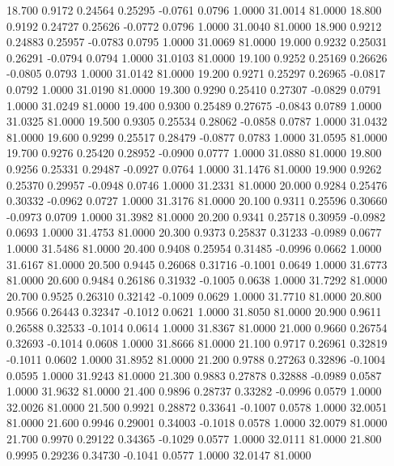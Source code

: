   18.700   0.9172   0.24564   0.25295  -0.0761   0.0796   1.0000  31.0014  81.0000
  18.800   0.9192   0.24727   0.25626  -0.0772   0.0796   1.0000  31.0040  81.0000
  18.900   0.9212   0.24883   0.25957  -0.0783   0.0795   1.0000  31.0069  81.0000
  19.000   0.9232   0.25031   0.26291  -0.0794   0.0794   1.0000  31.0103  81.0000
  19.100   0.9252   0.25169   0.26626  -0.0805   0.0793   1.0000  31.0142  81.0000
  19.200   0.9271   0.25297   0.26965  -0.0817   0.0792   1.0000  31.0190  81.0000
  19.300   0.9290   0.25410   0.27307  -0.0829   0.0791   1.0000  31.0249  81.0000
  19.400   0.9300   0.25489   0.27675  -0.0843   0.0789   1.0000  31.0325  81.0000
  19.500   0.9305   0.25534   0.28062  -0.0858   0.0787   1.0000  31.0432  81.0000
  19.600   0.9299   0.25517   0.28479  -0.0877   0.0783   1.0000  31.0595  81.0000
  19.700   0.9276   0.25420   0.28952  -0.0900   0.0777   1.0000  31.0880  81.0000
  19.800   0.9256   0.25331   0.29487  -0.0927   0.0764   1.0000  31.1476  81.0000
  19.900   0.9262   0.25370   0.29957  -0.0948   0.0746   1.0000  31.2331  81.0000
  20.000   0.9284   0.25476   0.30332  -0.0962   0.0727   1.0000  31.3176  81.0000
  20.100   0.9311   0.25596   0.30660  -0.0973   0.0709   1.0000  31.3982  81.0000
  20.200   0.9341   0.25718   0.30959  -0.0982   0.0693   1.0000  31.4753  81.0000
  20.300   0.9373   0.25837   0.31233  -0.0989   0.0677   1.0000  31.5486  81.0000
  20.400   0.9408   0.25954   0.31485  -0.0996   0.0662   1.0000  31.6167  81.0000
  20.500   0.9445   0.26068   0.31716  -0.1001   0.0649   1.0000  31.6773  81.0000
  20.600   0.9484   0.26186   0.31932  -0.1005   0.0638   1.0000  31.7292  81.0000
  20.700   0.9525   0.26310   0.32142  -0.1009   0.0629   1.0000  31.7710  81.0000
  20.800   0.9566   0.26443   0.32347  -0.1012   0.0621   1.0000  31.8050  81.0000
  20.900   0.9611   0.26588   0.32533  -0.1014   0.0614   1.0000  31.8367  81.0000
  21.000   0.9660   0.26754   0.32693  -0.1014   0.0608   1.0000  31.8666  81.0000
  21.100   0.9717   0.26961   0.32819  -0.1011   0.0602   1.0000  31.8952  81.0000
  21.200   0.9788   0.27263   0.32896  -0.1004   0.0595   1.0000  31.9243  81.0000
  21.300   0.9883   0.27878   0.32888  -0.0989   0.0587   1.0000  31.9632  81.0000
  21.400   0.9896   0.28737   0.33282  -0.0996   0.0579   1.0000  32.0026  81.0000
  21.500   0.9921   0.28872   0.33641  -0.1007   0.0578   1.0000  32.0051  81.0000
  21.600   0.9946   0.29001   0.34003  -0.1018   0.0578   1.0000  32.0079  81.0000
  21.700   0.9970   0.29122   0.34365  -0.1029   0.0577   1.0000  32.0111  81.0000
  21.800   0.9995   0.29236   0.34730  -0.1041   0.0577   1.0000  32.0147  81.0000
